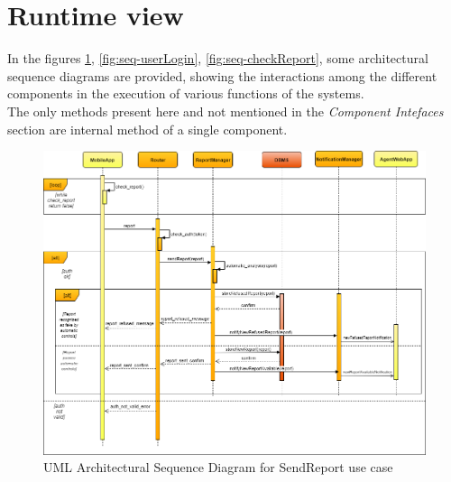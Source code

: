 \documentclass[a4paper]{report}
\begin{document}
\section{Runtime view}
In the figures \ref{fig:seq-sendReport}, \ref{fig:seq-userLogin}, \ref{fig:seq-checkReport}, some architectural sequence diagrams are provided, showing the interactions among the different components in the execution of various functions of the systems. \\
The only methods present here and not mentioned in the \textit{Component Intefaces} section are internal method of a single component.

\begin{landscape}

\begin{figure}[hp]
\includegraphics[angle=0, scale=0.70]{ArchSequenceSendReport}
\caption{UML Architectural Sequence Diagram for SendReport use case}
\label{fig:seq-sendReport}
\end{figure}

\end{landscape}
\restoregeometry
\end{document}
